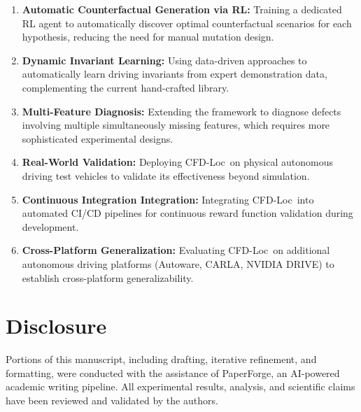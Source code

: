 \documentclass[conference]{IEEEtran}
\theoremstyle{plain}
\newcommand{\methodname}{CFD-Loc}
\begin{document}
\begin{enumerate}
    \item \textbf{Automatic Counterfactual Generation via RL:} Training a dedicated RL agent to automatically discover optimal counterfactual scenarios for each hypothesis, reducing the need for manual mutation design.
    \item \textbf{Dynamic Invariant Learning:} Using data-driven approaches to automatically learn driving invariants from expert demonstration data, complementing the current hand-crafted library.
    \item \textbf{Multi-Feature Diagnosis:} Extending the framework to diagnose defects involving multiple simultaneously missing features, which requires more sophisticated experimental designs.
    \item \textbf{Real-World Validation:} Deploying \methodname\ on physical autonomous driving test vehicles to validate its effectiveness beyond simulation.
    \item \textbf{Continuous Integration Integration:} Integrating \methodname\ into automated CI/CD pipelines for continuous reward function validation during development.
    \item \textbf{Cross-Platform Generalization:} Evaluating \methodname\ on additional autonomous driving platforms (Autoware, CARLA, NVIDIA DRIVE) to establish cross-platform generalizability.
\end{enumerate}

\section*{Disclosure}
\label{sec:disclosure}
Portions of this manuscript, including drafting, iterative refinement, and
formatting, were conducted with the assistance of PaperForge, an AI-powered
academic writing pipeline. All experimental results, analysis, and scientific
claims have been reviewed and validated by the authors.



\end{document}
